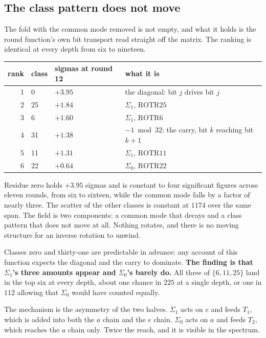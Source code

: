 \subsection{The class pattern does not move}

The fold with the common mode removed is not empty, and what it holds is the round function's own bit transport read straight off the matrix. The ranking is identical at every depth from six to nineteen.

\begin{center}
\begin{tabular}{rlll}
\toprule
rank & class & sigmas at round 12 & what it is \\
\midrule
1 & 0 & \(+3.95\) & the diagonal: bit \(j\) drives bit \(j\) \\
2 & 25 & \(+1.84\) & \(\Sigma_1\), \(\mathrm{ROTR}25\) \\
3 & 6 & \(+1.60\) & \(\Sigma_1\), \(\mathrm{ROTR}6\) \\
4 & 31 & \(+1.38\) & \(-1 \bmod 32\): the carry, bit \(k\) reaching bit \(k+1\) \\
5 & 11 & \(+1.31\) & \(\Sigma_1\), \(\mathrm{ROTR}11\) \\
6 & 22 & \(+0.64\) & \(\Sigma_0\), \(\mathrm{ROTR}22\) \\
\bottomrule
\end{tabular}
\end{center}

Residue zero holds \(+3.95\) sigmas and is constant to four significant figures across eleven rounds, from six to sixteen, while the common mode falls by a factor of nearly three. The scatter of the other classes is constant at \(1174\) over the same span. The field is two components: a common mode that decays and a class pattern that does not move at all. Nothing rotates, and there is no moving structure for an inverse rotation to unwind.

Classes zero and thirty-one are predictable in advance: any account of this function expects the diagonal and the carry to dominate. \textbf{The finding is that \(\Sigma_1\)'s three amounts appear and \(\Sigma_0\)'s barely do.} All three of \(\{6, 11, 25\}\) land in the top six at every depth, about one chance in \(225\) at a single depth, or one in \(112\) allowing that \(\Sigma_0\) would have counted equally.

The mechanism is the asymmetry of the two halves. \(\Sigma_1\) acts on \(e\) and feeds \(T_1\), which is added into both the \(a\) chain and the \(e\) chain. \(\Sigma_0\) acts on \(a\) and feeds \(T_2\), which reaches the \(a\) chain only. Twice the reach, and it is visible in the spectrum.


